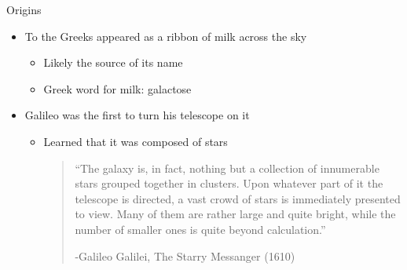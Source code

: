 \documentclass[pdf,aspectratio=169]{beamer}
\begin{document}


\begin{frame}{Origins}
  \begin{itemize}
	\item To the Greeks appeared as a ribbon of milk across the sky
	  \begin{itemize}
		\item Likely the source of its name
		\item Greek word for milk: galactose
	  \end{itemize}
	\item Galileo was the first to turn his telescope on it
	  \begin{itemize}
		\item Learned that it was composed of stars
		  \begin{quote}
			``The galaxy is, in fact, nothing but a collection of innumerable stars grouped together in clusters. Upon whatever part of it the telescope is directed, a vast crowd of stars is immediately presented to view. Many of them are rather large and quite bright, while the number of smaller ones is quite beyond calculation.''
			
			-Galileo Galilei, The Starry Messanger (1610)
		  \end{quote}
	  \end{itemize}
  \end{itemize}
\end{frame}
\end{document}
